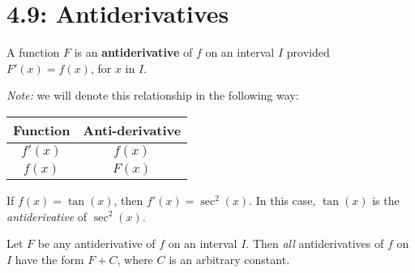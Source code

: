\documentclass[mathNotesPreamble]{subfiles}
\begin{document}
\section{4.9: Antiderivatives}
  \begin{defn*}[Antiderivative]
    A function $F$ is an \textbf{antiderivative} of $f$ on an interval $I$ provided $F'(x)=f(x)$, for $x$ in $I$.
  \end{defn*}
  \begin{center}
    \textit{Note:} we will denote this relationship in the following way:
    
    \begin{tabular}{@{}cc@{}}\toprule
      Function& Anti-derivative\\\midrule
      $f'(x)$& $f(x)$\\
      $f(x)$& $F(x)$\\\bottomrule
    \end{tabular}
  \end{center}
  
  \begin{ex*}
    If $f(x)=\tan(x)$, then $f'(x)=\sec^2(x)$. In this case, $\tan(x)$ is the \textit{antiderivative} of $\sec^2(x)$.
  \end{ex*}

  \begin{thmBox*}
    Let $F$ be any antiderivative of $f$ on an interval $I$. Then \textit{all} antiderivatives of $f$ on $I$ have the form $F+C$, where $C$ is an arbitrary constant.
  \end{thmBox*}
  
\end{document}
